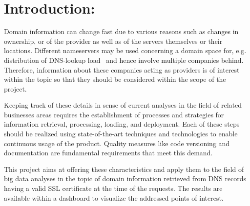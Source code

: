 \section{Introduction:}\label{sec:introduction}
Domain information can change fast due to various reasons such as changes in ownership, or of the provider as well as of the servers themselves or their locations.
Different nameservers may be used concerning a domain space for, e.g. distribution of DNS-lookup load~\autocite[cf.][]{Nutter.2003} and hence involve multiple companies behind.
Therefore, information about these companies acting as providers is of interest within the topic so that they should be considered within the scope of the project.

Keeping track of these details in sense of current analyses in the field of related businesses areas requires the establishment of processes and strategies for information retrieval, processing, loading, and deployment.
Each of these steps should be realized using state-of-the-art techniques and technologies to enable continuous usage of the product.
Quality measures like code versioning and documentation are fundamental requirements that meet this demand.

This project aims at offering these characteristics and apply them to the field of big data analyses in the topic of domain information retrieved from DNS records having a valid SSL certificate at the time of the requests.
The results are available within a dashboard to visualize the addressed points of interest.